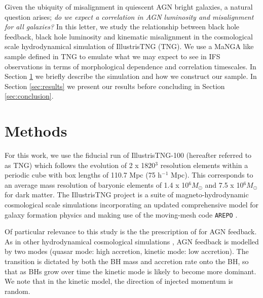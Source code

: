 \documentclass[fleqn,usenatbib]{mnras}
\begin{document}
Given the ubiquity of misalignment in quiescent AGN bright galaxies, a natural question arises; \textit{do we expect a correlation in AGN luminosity and misalignment for all galaxies?} In this letter, we study the relationship between black hole feedback, black hole luminosity and kinematic misalignment in the cosmological scale hydrodynamical simulation of IllustrisTNG (TNG). We use a MaNGA like sample defined in TNG to emulate what we may expect to see in IFS observations in terms of morphological dependence and correlation timescales. In Section \ref{sec:methods} we briefly describe the simulation and how we construct our sample. In Section \ref{sec:results} we present our results before concluding in Section \ref{sec:conclusion}.

\section{Methods} \label{sec:methods}
For this work, we use the fiducial run of IllustrisTNG-100 (hereafter referred to as TNG) which follows the evolution of 2 x 1820$^3$ resolution elements within a periodic cube with box lengths of 110.7 Mpc (75 h$^{-1}$ Mpc). This corresponds to an average mass resolution of baryonic elements of 1.4 x 10$^6 M_{\odot}$ and 7.5 x 10$^6 M_{\odot}$ for dark matter. The IllustrisTNG project \citep{marinacci18,naiman18,nelson18,pillepich18b,springel18} is a suite of magneto-hydrodynamic cosmological scale simulations incorporating an updated comprehensive model for galaxy formation physics \citep[as decribed in; ][]{weinberger17,pillepich18a} and making use of the moving-mesh code \texttt{AREPO} \citep{springel10,pakmor11,pakmor13}. 

Of particular relevance to this study is the the prescription of \citet{weinberger17} for AGN feedback. As in other hydrodynamical cosmological simulations \citep[e.g.][]{dubois2016}, AGN feedback is modelled by two modes (quasar mode: high accretion, kinetic mode: low accretion). The transition is dictated by both the BH mass and accretion rate onto the BH, so that as BHs grow over time the kinetic mode is likely to become more dominant. We note that in the kinetic model, the direction of injected momentum is random. 
\end{document}

